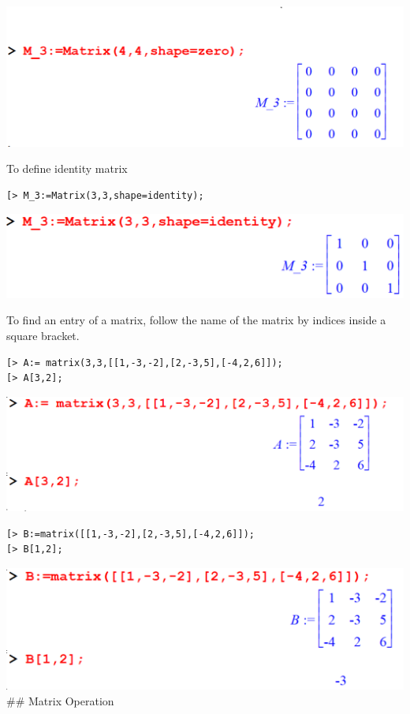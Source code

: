 \documentclass[
]{book}
\theoremstyle{definition}
\theoremstyle{definition}
\theoremstyle{definition}
\theoremstyle{definition}
\theoremstyle{remark}
\begin{document}
\includegraphics{figures/Lesson 4/fig20.png}

To define identity matrix

\begin{verbatim}
[> M_3:=Matrix(3,3,shape=identity);
\end{verbatim}

\includegraphics{figures/Lesson 4/fig21.png}

To find an entry of a matrix, follow the name of the matrix by indices inside a square bracket.

\begin{verbatim}
[> A:= matrix(3,3,[[1,-3,-2],[2,-3,5],[-4,2,6]]);
[> A[3,2];
\end{verbatim}

\includegraphics{figures/Lesson 4/fig22.png}

\begin{verbatim}
[> B:=matrix([[1,-3,-2],[2,-3,5],[-4,2,6]]);
[> B[1,2];
\end{verbatim}

\includegraphics{figures/Lesson 4/fig23.png} \#\# Matrix Operation
\end{document}
